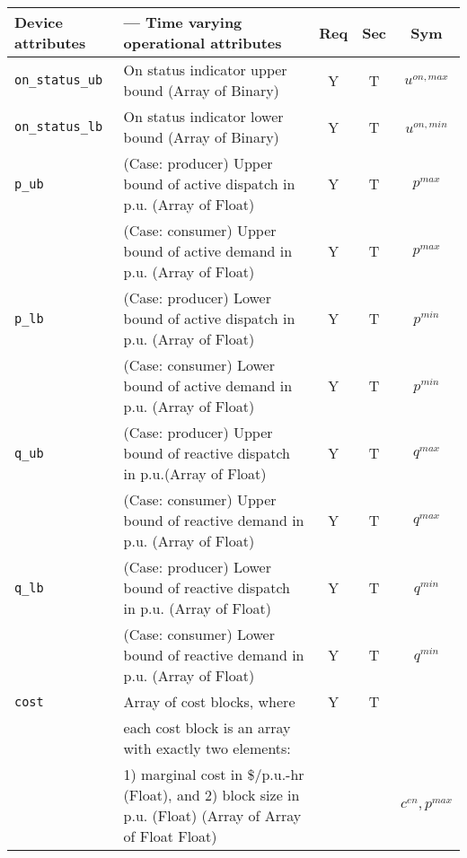 \documentclass{article}
\begin{document}
\begin{center}
\small
\begin{tabular}{ l | p{3.8in} | c | c | c |}
Device attributes & --- Time varying operational attributes &Req &Sec &Sym \\
\hline
  {\tt on\_status\_ub} & {On status indicator upper bound (Array of Binary)} & Y & T & $u^{on,max}$\\
  {\tt on\_status\_lb} & {On status indicator lower bound (Array of Binary)} & Y & T & $u^{on,min}$\\
  {\tt p\_ub} & { (Case: producer) Upper bound of active dispatch in p.u. (Array of Float)   }& Y & T & $p^{max}$ \\
              & { (Case: consumer) Upper bound of active demand in p.u.  (Array of Float)    }& Y & T & $p^{max}$ \\
  {\tt p\_lb} & { (Case: producer) Lower bound of active dispatch in p.u. (Array of Float)    }& Y & T & $p^{min}$ \\
              & { (Case: consumer) Lower bound of active demand in p.u.  (Array of Float)    }& Y & T & $p^{min}$ \\
  {\tt q\_ub} & { (Case: producer) Upper bound of reactive dispatch in p.u.(Array of Float)  }& Y & T & $q^{max}$\\
              & { (Case: consumer) Upper bound of reactive demand  in p.u. (Array of Float)  }& Y & T & $q^{max}$\\
  {\tt q\_lb} & { (Case: producer) Lower bound of reactive dispatch in p.u. (Array of Float)  }& Y & T & $q^{min}$\\
              & { (Case: consumer) Lower bound of reactive demand in p.u.  (Array of Float)  }& Y & T & $q^{min}$\\

  {\tt cost} &  Array of cost blocks, where & Y & T &  \\
    &  each cost block is an array with exactly two elements:   &  &   &  \\
    &  1) marginal cost in \$/p.u.-hr (Float), and 2) block size in p.u. (Float) (Array of Array of Float Float) &  &   &$c^{en}, p^{max}$ \\
\hline
\end{tabular}
\end{center}
\end{document}
